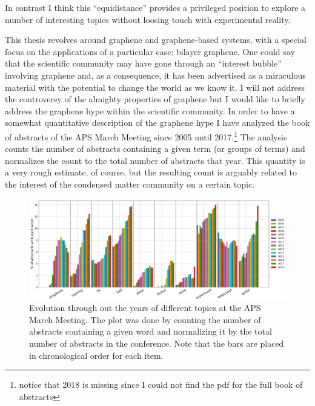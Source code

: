 In contrast I think this ``equidistance'' provides a privileged position to explore a number of interesting topics without loosing touch with experimental reality.
\bigskip

This thesis revolves around graphene and graphene-based systems, with a special focus on the applications of a particular case: bilayer graphene.
One could say that the scientific community may have gone through an ``interest bubble'' involving graphene and, as a consequence, it has been advertised as a miraculous material with the potential to change the world as we know it. I will not address the controversy of the almighty properties of graphene but I would like to briefly address the graphene hype within the scientific community.
In order to have a somewhat quantitative description of the graphene hype I have analyzed the book of abstracts of the APS March Meeting since 2005 until 2017.\footnote{notice that 2018 is missing since I could not find the pdf for the full book of abstracts}
The analysis counts the number of abstracts containing a given term (or groups of terms) and normalizes the count to the total number of abstracts that year.
This quantity is a very rough estimate, of course, but the resulting count is arguably related to the interest of the condensed matter community on a certain topic.

\begin{figure}[h!]
\centering
\includegraphics{introduction/figures/topics.png}
\vspace{-20pt}
\caption{Evolution through out the years of different topics at the APS March Meeting. The plot was done by counting the number of abstracts containing a given word and normalizing it by the total number of abstracts in the conference. Note that the bars are placed in chronological order for each item.}
\label{topics}
\end{figure}

